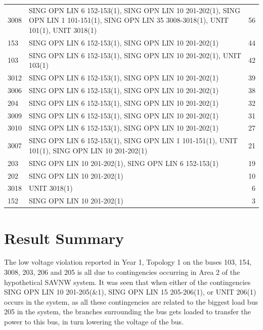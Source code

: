 \documentclass[10pt]{report}
\begin{document}
\begin{table}[H]
{\begin{tabular}{lp{18cm}r}
3008 & SING OPN LIN   6 152-153(1), SING OPN LIN   10 201-202(1), SING OPN LIN   1 101-151(1), SING OPN LIN   35 3008-3018(1), UNIT 101(1), UNIT 3018(1) & 56 \\

153 & SING OPN LIN   6 152-153(1), SING OPN LIN   10 201-202(1) & 44 \\

103 & SING OPN LIN   6 152-153(1), SING OPN LIN   10 201-202(1), UNIT 103(1) & 42 \\

3012 & SING OPN LIN   6 152-153(1), SING OPN LIN   10 201-202(1) & 39 \\

3006 & SING OPN LIN   6 152-153(1), SING OPN LIN   10 201-202(1) & 38 \\

204 & SING OPN LIN   6 152-153(1), SING OPN LIN   10 201-202(1) & 32 \\

3009 & SING OPN LIN   6 152-153(1), SING OPN LIN   10 201-202(1) & 31 \\

3010 & SING OPN LIN   6 152-153(1), SING OPN LIN   10 201-202(1) & 27 \\
3007 & SING OPN LIN   6 152-153(1), SING OPN LIN   1 101-151(1), UNIT 101(1), SING OPN LIN   10 201-202(1) & 21 \\
203 & SING OPN LIN   10 201-202(1), SING OPN LIN   6 152-153(1) & 19 \\
202 & SING OPN LIN   10 201-202(1) & 10 \\
3018 & UNIT 3018(1) & 6 \\
152 & SING OPN LIN   10 201-202(1) & 3 \\

\bottomrule
\end{tabular}}
\end{table}


\section{Result Summary}
The low voltage violation reported in Year 1, Topology 1 on the buses 103, 154, 3008, 203, 206 and 205 is all due to contingencies occurring in Area 2 of the hypothetical SAVNW system. It was seen that when either of the contingencies SING OPN LIN   10 201-205(\&1), SING OPN LIN   15 205-206(1), or UNIT 206(1) occurs in the system, as all these contingencies are related to the biggest load bus 205 in the system, the branches surrounding the bus gets loaded to transfer the power to this bus, in turn lowering the voltage of the bus.  
\end{document}
